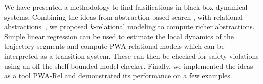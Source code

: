 
We have presented a methodology to find falsifications in black box
dynamical systems. Combining the ideas from abstraction based search
\cite{zutshi2014multiple}, with relational
abstractions~\cite{sankaranarayanan2011relational}, we proposed
$k$-relational modeling to compute richer abstractions. Simple linear
regression can be used to estimate the local dynamics of the
trajectory segments and compute PWA relational models which can be
interpreted as a transition system.  These can then be checked for
safety violations using an off-the-shelf bounded model checker.
Finally, we implemented the ideas as a tool PWA-Rel and demonstrated
its performance on a few examples.







